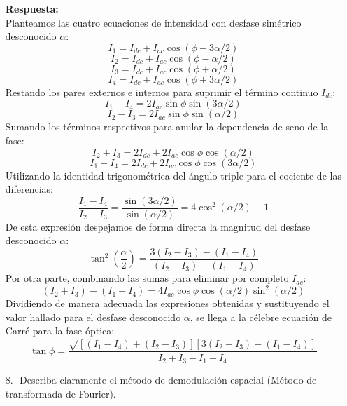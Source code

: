 \documentclass[12pt,letterpaper]{article}
\begin{document}
\begin{enumerate}
		\vspace{0.3cm}
		\textbf{Respuesta:} \\
		Planteamos las cuatro ecuaciones de intensidad con desfase simétrico desconocido $\alpha$:
		\[ I_1 = I_{dc} + I_{ac} \cos(\phi - 3\alpha/2) \]
		\[ I_2 = I_{dc} + I_{ac} \cos(\phi - \alpha/2) \]
		\[ I_3 = I_{dc} + I_{ac} \cos(\phi + \alpha/2) \]
		\[ I_4 = I_{dc} + I_{ac} \cos(\phi + 3\alpha/2) \]
		Restando los pares externos e internos para suprimir el término continuo $I_{dc}$:
		\[ I_1 - I_4 = 2 I_{ac} \sin\phi \sin(3\alpha/2) \]
		\[ I_2 - I_3 = 2 I_{ac} \sin\phi \sin(\alpha/2) \]
		Sumando los términos respectivos para anular la dependencia de seno de la fase:
		\[ I_2 + I_3 = 2 I_{dc} + 2 I_{ac} \cos\phi \cos(\alpha/2) \]
		\[ I_1 + I_4 = 2 I_{dc} + 2 I_{ac} \cos\phi \cos(3\alpha/2) \]
		Utilizando la identidad trigonométrica del ángulo triple para el cociente de las diferencias:
		\[ \frac{I_1 - I_4}{I_2 - I_3} = \frac{\sin(3\alpha/2)}{\sin(\alpha/2)} = 4\cos^2(\alpha/2) - 1 \]
		De esta expresión despejamos de forma directa la magnitud del desfase desconocido $\alpha$:
		\[ \tan^2\left(\frac{\alpha}{2}\right) = \frac{3(I_2 - I_3) - (I_1 - I_4)}{(I_2 - I_3) + (I_1 - I_4)} \]
		Por otra parte, combinando las sumas para eliminar por completo $I_{dc}$:
		\[ (I_2 + I_3) - (I_1 + I_4) = 4 I_{ac} \cos\phi \cos(\alpha/2) \sin^2(\alpha/2) \]
		Dividiendo de manera adecuada las expresiones obtenidas y sustituyendo el valor hallado para el desfase desconocido $\alpha$, se llega a la célebre ecuación de Carré para la fase óptica:
		\[ \tan\phi = \frac{\sqrt{[(I_1 - I_4) + (I_2 - I_3)][3(I_2 - I_3) - (I_1 - I_4)]}}{I_2 + I_3 - I_1 - I_4} \]
		\vspace{0.5cm}
		
		\item[8.-] Describa claramente el método de demodulación espacial (Método de transformada de Fourier).
		

\end{enumerate}
\end{document}
